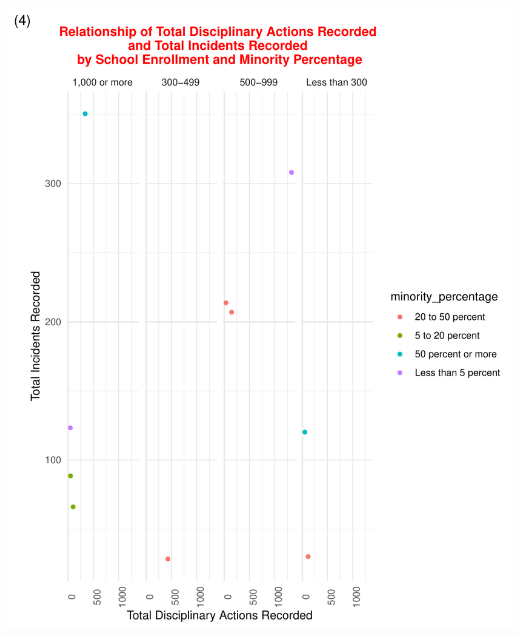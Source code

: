 \documentclass[man]{apa6}
\begin{document}
\begin{table}[tbp]
\begin{center}
\begin{threeparttable}

\end{threeparttable}
\end{center}

\end{table}

\includegraphics{111_files/figure-latex/plots-tidydisc2-1.pdf} 
\end{document}
